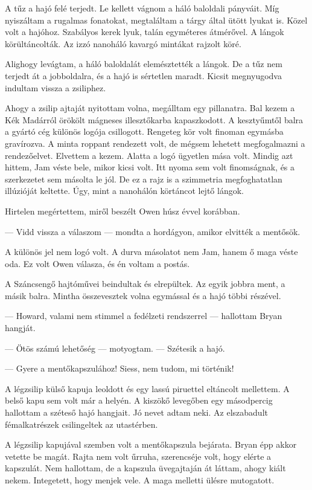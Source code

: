 \documentclass[10pt]{memoir}
\begin{document}
A tűz a hajó felé terjedt. Le kellett vágnom a háló baloldali pányváit. Míg
nyiszáltam a rugalmas fonatokat, megtaláltam a tárgy által ütött lyukat is.
Közel volt a hajóhoz. Szabályos kerek lyuk, talán egyméteres átmérővel. A
lángok körültáncolták. Az izzó nanoháló kavargó mintákat rajzolt köré.

Alighogy levágtam, a háló baloldalát elemésztették a lángok. De a tűz nem
terjedt át a jobboldalra, és a hajó is sértetlen maradt. Kicsit megnyugodva
indultam vissza a zsiliphez.

Ahogy a zsilip ajtaját nyitottam volna, megálltam egy pillanatra. Bal kezem a
Kék Madárról örökölt mágneses illesztőkarba kapaszkodott. A kesztyűmtől balra a
gyártó cég különös logója csillogott. Rengeteg kör volt finoman egymásba
gravírozva. A minta roppant rendezett volt, de mégsem lehetett megfogalmazni a
rendezőelvet. Elvettem a kezem. Alatta a logó ügyetlen mása volt. Mindig azt
hittem, Jam véste bele, mikor kicsi volt. Itt nyoma sem volt finomságnak, és a
szerkezetet sem másolta le jól. De ez a rajz is a szimmetria megfoghatatlan
illúzióját keltette. Úgy, mint a nanohálón körtáncot lejtő lángok.

Hirtelen megértettem, miről beszélt Owen húsz évvel korábban.

— Vidd vissza a válaszom — mondta a hordágyon, amikor elvitték a mentősök.

A különös jel nem logó volt. A durva másolatot nem Jam, hanem ő maga véste oda.
Ez volt Owen válasza, és én voltam a postás.

A Száncsengő hajtóművei beindultak és elrepültek. Az egyik jobbra ment, a másik
balra. Mintha összevesztek volna egymással és a hajó többi részével.

— Howard, valami nem stimmel a fedélzeti rendszerrel — hallottam Bryan hangját.

— Ötös számú lehetőség — motyogtam. — Szétesik a hajó.

— Gyere a mentőkapszulához! Siess, nem tudom, mi történik!

A légzsilip külső kapuja leoldott és egy lassú piruettel eltáncolt mellettem. A
belső kapu sem volt már a helyén. A kiszökő levegőben egy másodpercig hallottam
a széteső hajó hangjait. Jó nevet adtam neki. Az elszabadult fémalkatrészek
csilingeltek az utastérben.

A légzsilip kapujával szemben volt a mentőkapszula bejárata. Bryan épp akkor
vetette be magát. Rajta nem volt űrruha, szerencséje volt, hogy elérte a
kapszulát. Nem hallottam, de a kapszula üvegajtaján át láttam, ahogy kiált
nekem. Integetett, hogy menjek vele. A maga melletti ülésre mutogatott.
\end{document}
